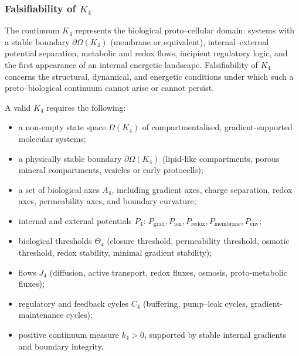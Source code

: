 
\subsubsection{Falsifiability of \texorpdfstring{$K_4$}{K_4}}
\label{sec:falsifiability-k4}

The continuum $K_4$ represents the biological proto–cellular domain:
systems with a stable boundary $\partial\Omega(K_4)$ (membrane or equivalent),
internal–external potential separation, metabolic and redox flows,
incipient regulatory logic, and the first appearance of an internal
energetic landscape.  
Falsifiability of $K_4$ concerns the structural, dynamical, and
energetic conditions under which such a proto–biological continuum
cannot arise or cannot persist.

A valid $K_4$ requires the following:
\begin{itemize}
    \item a non-empty state space $\Omega(K_4)$ of compartmentalised,
          gradient-supported molecular systems;
    \item a physically stable boundary $\partial\Omega(K_4)$
          (lipid-like compartments, porous mineral compartments,
          vesicles or early protocells);
    \item a set of biological axes $A_4$, including gradient axes,
          charge separation, redox axes, permeability axes,
          and boundary curvature;
    \item internal and external potentials $P_4$:
          $P_{\mathrm{grad}}, P_{\mathrm{ion}}, P_{\mathrm{redox}},
           P_{\mathrm{membrane}}, P_{\mathrm{env}}$;
    \item biological thresholds $\Theta_4$ (closure threshold,
          permeability threshold, osmotic threshold,
          redox stability, minimal gradient stability);
    \item flows $J_4$ (diffusion, active transport, redox fluxes,
          osmosis, proto-metabolic fluxes);
    \item regulatory and feedback cycles $C_4$ (buffering,
          pump–leak cycles, gradient-maintenance cycles);
    \item positive continuum measure $k_4>0$, supported by
          stable internal gradients and boundary integrity.
\end{itemize}

